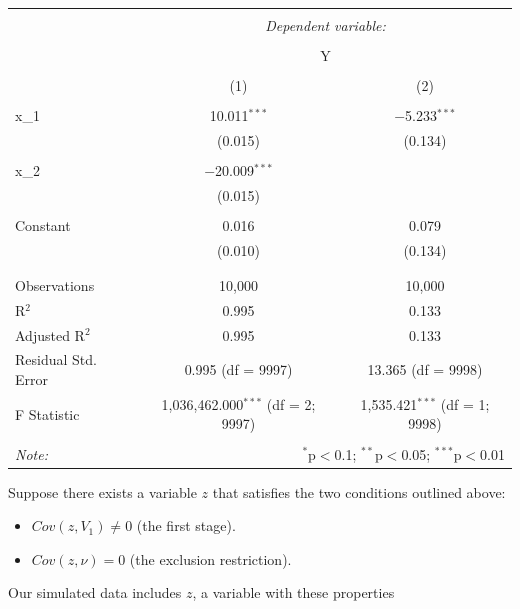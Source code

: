 \documentclass[
]{article}
\begin{document}
\begin{table}[!htbp] \centering 
  \caption{} 
  \label{} 
\begin{tabular}{@{\extracolsep{5pt}}lcc} 
\\[-1.8ex]\hline 
\hline \\[-1.8ex] 
 & \multicolumn{2}{c}{\textit{Dependent variable:}} \\ 
\cline{2-3} 
\\[-1.8ex] & \multicolumn{2}{c}{Y} \\ 
\\[-1.8ex] & (1) & (2)\\ 
\hline \\[-1.8ex] 
 x\_1 & 10.011$^{***}$ & $-$5.233$^{***}$ \\ 
  & (0.015) & (0.134) \\ 
  & & \\ 
 x\_2 & $-$20.009$^{***}$ &  \\ 
  & (0.015) &  \\ 
  & & \\ 
 Constant & 0.016 & 0.079 \\ 
  & (0.010) & (0.134) \\ 
  & & \\ 
\hline \\[-1.8ex] 
Observations & 10,000 & 10,000 \\ 
R$^{2}$ & 0.995 & 0.133 \\ 
Adjusted R$^{2}$ & 0.995 & 0.133 \\ 
Residual Std. Error & 0.995 (df = 9997) & 13.365 (df = 9998) \\ 
F Statistic & 1,036,462.000$^{***}$ (df = 2; 9997) & 1,535.421$^{***}$ (df = 1; 9998) \\ 
\hline 
\hline \\[-1.8ex] 
\textit{Note:}  & \multicolumn{2}{r}{$^{*}$p$<$0.1; $^{**}$p$<$0.05; $^{***}$p$<$0.01} \\ 
\end{tabular} 
\end{table}

Suppose there exists a variable \(z\) that satisfies the two conditions
outlined above:

\begin{itemize}
\item $Cov(z, V_1)\neq 0$ (the first stage).
\item $Cov(z, \nu)= 0$ (the exclusion restriction). 
\end{itemize}

Our simulated data includes \(z\), a variable with these properties
\end{document}
